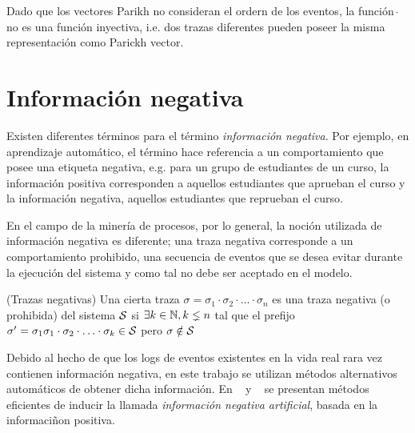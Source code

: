 Dado que los vectores Parikh no consideran el ordern de los eventos, la función \mbox{$\widehat{\ }$} no 
es una función inyectiva, i.e. dos trazas diferentes pueden poseer la misma representación como Parickh
vector.

\section{Información negativa} 
\label{sec:2.negative}

Existen diferentes términos para el término \textit{información negativa}. Por ejemplo, en aprendizaje automático,
el término hace referencia a un comportamiento que posee una etiqueta negativa, e.g. para un grupo
de estudiantes de un curso, la información positiva corresponden a aquellos estudiantes que aprueban el curso
y la información negativa, aquellos estudiantes que reprueban el curso. 

En el campo de la minería de procesos, por lo general, la noción utilizada de información negativa es diferente;
una traza negativa corresponde a un comportamiento prohibido, una secuencia de eventos que se desea 
evitar durante la ejecución del sistema y como tal no debe ser aceptado en el modelo.

\begin{definition}
    \label{def:neg}
    (Trazas negativas) Una cierta traza $\sigma=\sigma_1\cdot\sigma_2\cdot\ldots\cdot\sigma_n$ es
    una traza negativa (o prohibida) del sistema $\mathcal{S}$ si $\exists k \in \mathbb{N}, k \lneq n$ tal que
    el prefijo $\sigma'=\sigma_1\sigma_1\cdot\sigma_2\cdot\ldots\cdot\sigma_k \in \mathcal{S}$ pero $\sigma \notin \mathcal{S}$
\end{definition}

Debido al hecho de que los logs de eventos existentes en la vida real rara vez contienen información negativa, 
en este trabajo se utilizan métodos alternativos automáticos de obtener dicha información. En ~\cite{Goedertier2009} 
y ~\cite{BrouckeWVB14} se presentan métodos eficientes de inducir la llamada \textit{información negativa artificial},
basada en la informaciñon positiva. 

